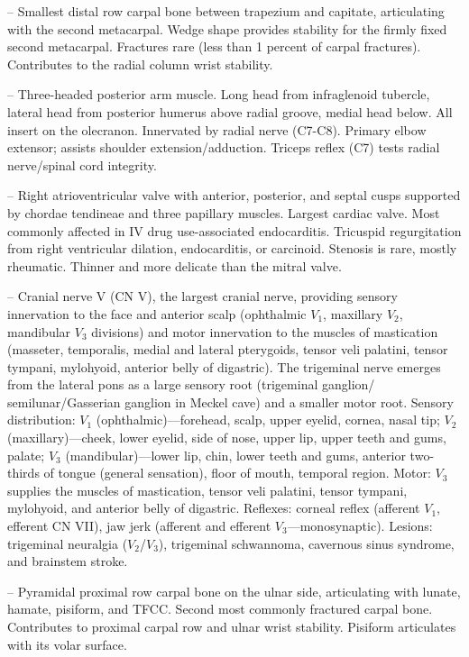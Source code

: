 -- Smallest distal row carpal bone between trapezium and capitate, articulating with the second metacarpal. Wedge shape provides stability for the firmly fixed second metacarpal. Fractures rare (less than 1 percent of carpal fractures). Contributes to the radial column wrist stability.

-- Three-headed posterior arm muscle. Long head from infraglenoid tubercle, lateral head from posterior humerus above radial groove, medial head below. All insert on the olecranon. Innervated by radial nerve (C7-C8). Primary elbow extensor; assists shoulder extension/adduction. Triceps reflex (C7) tests radial nerve/spinal cord integrity.

-- Right atrioventricular valve with anterior, posterior, and septal cusps supported by chordae tendineae and three papillary muscles. Largest cardiac valve. Most commonly affected in IV drug use-associated endocarditis. Tricuspid regurgitation from right ventricular dilation, endocarditis, or carcinoid. Stenosis is rare, mostly rheumatic. Thinner and more delicate than the mitral valve.

-- Cranial nerve V (CN V), the largest cranial nerve, providing sensory innervation to the face and anterior scalp (ophthalmic $V_1$, maxillary $V_2$, mandibular $V_3$ divisions) and motor innervation to the muscles of mastication (masseter, temporalis, medial and lateral pterygoids, tensor veli palatini, tensor tympani, mylohyoid, anterior belly of digastric). The trigeminal nerve emerges from the lateral pons as a large sensory root (trigeminal ganglion/ semilunar/Gasserian ganglion in Meckel cave) and a smaller motor root. Sensory distribution: $V_1$ (ophthalmic)—forehead, scalp, upper eyelid, cornea, nasal tip; $V_2$ (maxillary)—cheek, lower eyelid, side of nose, upper lip, upper teeth and gums, palate; $V_3$ (mandibular)—lower lip, chin, lower teeth and gums, anterior two-thirds of tongue (general sensation), floor of mouth, temporal region. Motor: $V_3$ supplies the muscles of mastication, tensor veli palatini, tensor tympani, mylohyoid, and anterior belly of digastric. Reflexes: corneal reflex (afferent $V_1$, efferent CN VII), jaw jerk (afferent and efferent $V_3$—monosynaptic). Lesions: trigeminal neuralgia ($V_2$/$V_3$), trigeminal schwannoma, cavernous sinus syndrome, and brainstem stroke.

-- Pyramidal proximal row carpal bone on the ulnar side, articulating with lunate, hamate, pisiform, and TFCC. Second most commonly fractured carpal bone. Contributes to proximal carpal row and ulnar wrist stability. Pisiform articulates with its volar surface.

